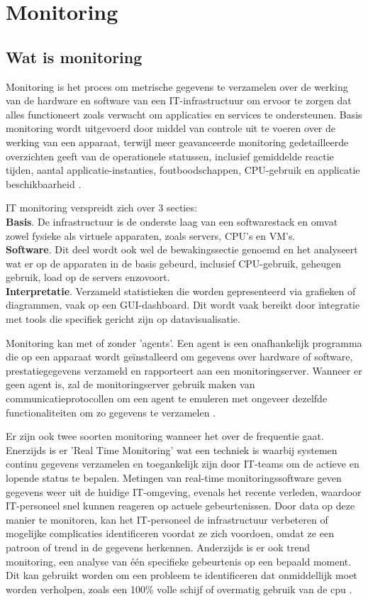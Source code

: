 \section{Monitoring}
\subsection{Wat is monitoring}
Monitoring is het proces om metrische gegevens te verzamelen over de werking van de hardware en software van een IT-infrastructuur om ervoor te zorgen dat alles functioneert zoals verwacht om applicaties en services te ondersteunen. Basis monitoring wordt uitgevoerd door middel van controle uit te voeren over de werking van een apparaat, terwijl meer geavanceerde monitoring gedetailleerde overzichten geeft van de operationele statussen, inclusief gemiddelde reactie tijden, aantal applicatie-instanties, foutboodschappen, CPU-gebruik en applicatie beschikbaarheid \autocite{TechTarget2020}.

IT monitoring verspreidt zich over 3 secties:\\
\textbf{Basis}. De infrastructuur is de onderste laag van een softwarestack en omvat zowel fysieke als virtuele apparaten, zoals servers, CPU's en VM's. \\
\textbf{Software}. Dit deel wordt ook wel de bewakingssectie genoemd en het analyseert wat er op de apparaten in de basis gebeurd, inclusief CPU-gebruik, geheugen gebruik, load op de servers enzovoort.\\
\textbf{Interpretatie}. Verzameld statistieken die worden gepresenteerd via grafieken of diagrammen, vaak op een GUI-dashboard. Dit wordt vaak bereikt door integratie met tools die specifiek gericht zijn op datavisualisatie.

Monitoring kan met of zonder 'agents'. Een agent is een onafhankelijk programma die op een apparaat wordt geïnstalleerd om gegevens over hardware of software, prestatiegegevens verzameld en rapporteert aan een monitoringserver. Wanneer er geen agent is, zal de monitoringserver gebruik maken van communicatieprotocollen om een agent te emuleren met ongeveer dezelfde functionaliteiten om zo gegevens te verzamelen \autocite{TechTarget2020}.

Er zijn ook twee soorten monitoring wanneer het over de frequentie gaat. Enerzijds is er 'Real Time Monitoring' wat een techniek is waarbij systemen continu gegevens verzamelen en toegankelijk zijn door IT-teams om de actieve en lopende status te bepalen. Metingen van real-time monitoringssoftware geven gegevens weer uit de huidige IT-omgeving, evenals het recente verleden, waardoor IT-personeel snel kunnen reageren op actuele gebeurtenissen. Door data op deze manier te monitoren, kan het IT-personeel de infrastructuur verbeteren of mogelijke complicaties identificeren voordat ze zich voordoen, omdat ze een patroon of trend in de gegevens herkennen. Anderzijds is er ook trend monitoring, een analyse van één specifieke gebeurtenis op een bepaald moment. Dit kan gebruikt worden om een probleem te identificeren dat onmiddellijk moet worden verholpen, zoals een 100\% volle schijf of overmatig gebruik van de cpu \autocite{TechTarget2020}.

